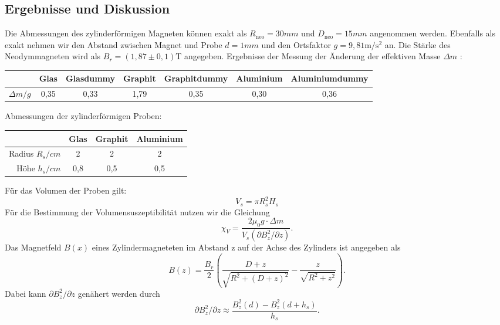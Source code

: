 \documentclass[
	a4paper,
	12pt,
	pagesize,
	ngerman
]{scrartcl}
\begin{document}
	\subsection{Ergebnisse und Diskussion}
	Die Abmessungen des zylinderförmigen Magneten können exakt als $R_\text{neo}=30 \si{mm}$ und $D_\text{neo}=15 \si{mm}$ angenommen werden. Ebenfalls als exakt nehmen wir den Abstand zwischen Magnet und Probe $d=1\si{mm}$ und den Ortsfaktor $g=9,81\si{\meter \per \second \squared}$ an. Die Stärke des Neodymmagneten wird als $B_r = (1,87 \pm 0,1 ) \si{\tesla}$ angegeben.
	\newline
	Ergebnisse der Messung der Änderung der effektiven Masse $\Delta m$ : \newline
	\begin{tabular}{ r | c | c | c | c | c | c}
		 & Glas & Glasdummy & Graphit & Graphitdummy & Aluminium & Aluminiumdummy\\ \hline
		$\Delta m  \si{/g}$ & 0,35 &0,33 &1,79 & 0,35 & 0,30 & 0,36\\
	\end{tabular}
	\newline
	Abmessungen der zylinderförmigen Proben: \newline
	\begin{tabular}{ r | c | c | c}
		& Glas & Graphit & Aluminium \\ \hline
		Radius $R_s \si{/cm}$ & 2 & 2 & 2\\
		Höhe $h_s \si{/cm}$ & 0,8 & 0,5 & 0,5\\
	\end{tabular} \newline
	Für das Volumen der Proben gilt:
	\begin{equation}
		\label{Volumen_Zylinder}
		V_s=\pi R_s^2 H_s
	\end{equation}
	Für die Bestimmung der Volumensuszeptibilität nutzen wir die Gleichung
	\begin{equation}
	\label{Suzeptibilitaet}
	\chi_V=\frac{2 \mu_0 g \cdot \Delta m}{V_s(\partial B_z^2 /\partial z)}.
	\end{equation}
	Das Magnetfeld $B(x)$ eines Zylindermagneteten im Abstand z auf der Achse des Zylinders ist angegeben als
	\begin{equation}
	\label{Magnetfeld_Zylinder}
	B(z)=\frac{B_r}{2}\left( \frac{D+z}{\sqrt{R^2+(D+z)^2}}-\frac{z}{\sqrt{R^2 +z^2}}\right).
	\end{equation}
	Dabei kann $\partial B_z^2 /\partial z$ genähert werden durch 
	\begin{equation}
	\label{Ableitung_Magnetfeld}
	\partial B_z^2 /\partial z \approx \frac{B_z^2(d) - B_z^2(d+h_s)}{h_s}.
	\end{equation} 
\end{document}
